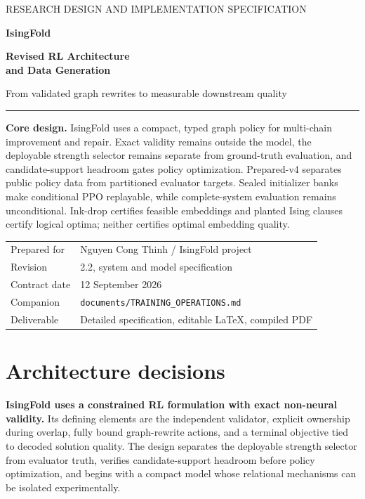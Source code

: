 \documentclass[11pt,a4paper]{article}
\newcommand{\code}[1]{\texttt{\small #1}}
\theoremstyle{definition}\newtheorem{definition}[proposition]{Definition}
\begin{document}
\begin{titlepage}
\color{Navy}
\vspace*{12mm}
{\small\sffamily RESEARCH DESIGN AND IMPLEMENTATION SPECIFICATION}\par
\vspace{15mm}
{\Huge\bfseries IsingFold}\par
\vspace{6mm}
{\LARGE\bfseries Revised RL Architecture\\and Data Generation}\par
\vspace{7mm}
{\large From validated graph rewrites to measurable downstream quality}\par
\vspace{12mm}
\rule{\textwidth}{1pt}\par
\vspace{6mm}
\begin{decisionbox}
\textbf{Core design.} IsingFold uses a compact, typed graph policy for multi-chain improvement and repair. Exact validity remains outside the model, the deployable strength selector remains separate from ground-truth evaluation, and candidate-support headroom gates policy optimization. Prepared-v4 separates public policy data from partitioned evaluator targets. Sealed initializer banks make conditional PPO replayable, while complete-system evaluation remains unconditional. Ink-drop certifies feasible embeddings and planted Ising clauses certify logical optima; neither certifies optimal embedding quality.
\end{decisionbox}
\vfill
\begin{tabular}{@{}ll}
Prepared for & Nguyen Cong Thinh / IsingFold project\\
Revision & 2.2, system and model specification\\
Contract date & 12 September 2026\\
Companion & \code{documents/TRAINING\_OPERATIONS.md}\\
Deliverable & Detailed specification, editable LaTeX, compiled PDF
\end{tabular}
\vspace{12mm}
\end{titlepage}
\section*{Architecture decisions}
\textbf{IsingFold uses a constrained RL formulation with exact non-neural validity.} Its defining elements are the independent validator, explicit ownership during overlap, fully bound graph-rewrite actions, and a terminal objective tied to decoded solution quality. The design separates the deployable strength selector from evaluator truth, verifies candidate-support headroom before policy optimization, and begins with a compact model whose relational mechanisms can be isolated experimentally.
\end{document}
